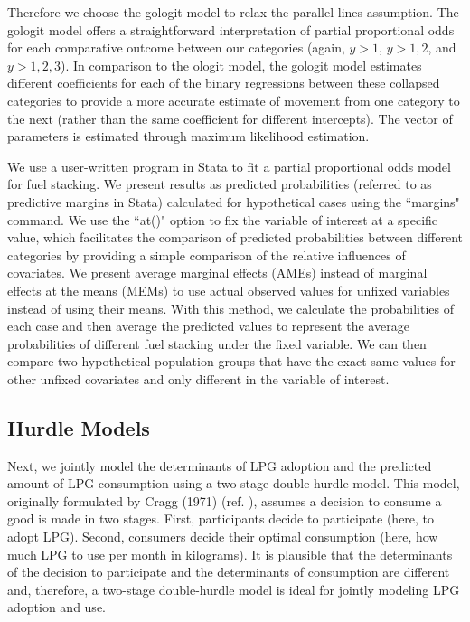 \documentclass[11pt,english]{article}
\theoremstyle{plain} \newtheorem{claim}{Claim}
\theoremstyle{plain} \newtheorem{prop}{Proposition}
\theoremstyle{plain} \newtheorem{hypo}{Hypothesis}
\begin{document}
Therefore we choose the gologit model to relax the parallel lines assumption. The gologit model offers a straightforward interpretation of partial proportional odds for each comparative outcome between our categories (again, $y>1$, $y>1,2$, and $y>1,2,3$). In comparison to the ologit model, the gologit model estimates different coefficients for each of the binary regressions between these collapsed categories to provide a more accurate estimate of movement from one category to the next (rather than the same coefficient for different intercepts). The vector of parameters is estimated through maximum likelihood estimation.

We use a user-written program in Stata to fit a partial proportional odds model for fuel stacking\citep{Williams2006}. We present results as predicted probabilities (referred to as predictive margins in Stata) calculated for hypothetical cases using the ``margins" command\citep{Williams2012}. We use the ``at()" option to fix the variable of interest at a specific value, which facilitates the comparison of predicted probabilities between different categories by providing a simple comparison of the relative influences of covariates. We present average marginal effects (AMEs) instead of marginal effects at the means (MEMs) to use actual observed values for unfixed variables instead of using their means. With this method, we calculate the probabilities of each case and then average the predicted values to represent the average probabilities of different fuel stacking under the fixed variable. We can then compare two hypothetical population groups that have the exact same values for other unfixed covariates and only different in the variable of interest.

\subsection*{Hurdle Models}

Next, we jointly model the determinants of LPG adoption and the predicted amount of LPG consumption using a two-stage double-hurdle model. This model, originally formulated by Cragg (1971)
(ref. \cite{Cragg1971}), assumes a decision to consume a good is made in two stages. First, participants decide to participate (here, to adopt LPG). Second, consumers decide their optimal consumption (here, how much LPG to use per month in kilograms)\cite{Garcia2013}. It is plausible that the determinants of the decision to participate and the determinants of consumption are different and, therefore, a two-stage double-hurdle model is ideal for jointly modeling LPG adoption and use. 
\end{document}
